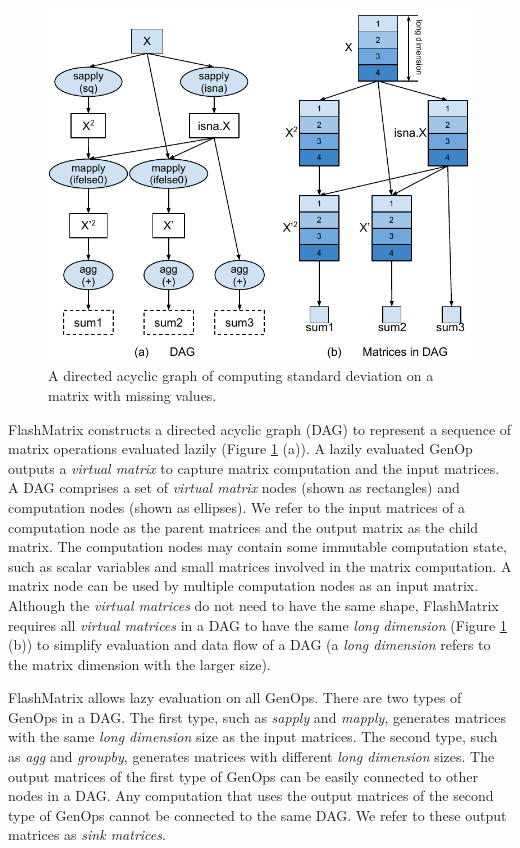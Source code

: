 \begin{figure}
	\centering
	\includegraphics[scale=0.7]{FlashMatrix_figs/sd.pdf}
	\caption{A directed acyclic graph of computing standard deviation on
	a matrix with missing values.}
	\label{fig:DAG}
\end{figure}

FlashMatrix constructs a directed acyclic graph (DAG) to represent a sequence
of matrix operations evaluated lazily (Figure \ref{fig:DAG} (a)). A lazily
evaluated GenOp outputs a \textit{virtual matrix} to capture matrix computation
and the input matrices. A
DAG comprises a set of \textit{virtual matrix} nodes (shown as rectangles)
and computation nodes (shown as ellipses). We refer to the input matrices of
a computation node as the parent matrices and the output matrix as the child matrix.
The computation nodes may contain some immutable computation state, such as
scalar variables and small matrices involved in the matrix computation.
A matrix node can be used by multiple computation nodes as
an input matrix. Although the \textit{virtual matrices} do not need to have
the same shape, FlashMatrix requires all \textit{virtual matrices} in a DAG
to have the same \textit{long dimension} (Figure \ref{fig:DAG} (b)) to
simplify evaluation and data flow of a DAG (a \textit{long dimension}
refers to the matrix dimension with the larger size).

FlashMatrix allows lazy evaluation on all GenOps. There are two types of GenOps
in a DAG. The first type, such as \textit{sapply} and \textit{mapply}, generates
matrices with the same \textit{long dimension} size as the input matrices.
The second type, such as \textit{agg} and \textit{groupby}, generates matrices
with different \textit{long dimension} sizes. The output matrices of the first
type of GenOps can be easily connected to other nodes in a DAG. Any computation
that %
uses the output matrices of the second type of GenOps
cannot be connected to the same DAG.  We refer to these output matrices as
\textit{sink matrices}.

